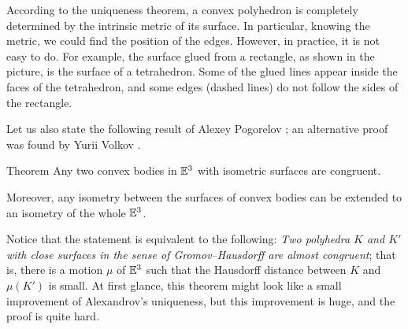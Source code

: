 According to the uniqueness theorem, a convex polyhedron is completely determined by the intrinsic metric of its surface.
In particular, knowing the metric, we could find the position of the edges.
However, in practice, it is not easy to do.
For example, the surface glued from a rectangle, as shown in the picture, is the surface of a tetrahedron.
Some of the glued lines appear inside the faces of the tetrahedron, and some edges (dashed lines) do not follow the sides of the rectangle.

Let us also state the following result of Alexey Pogorelov \cite[chapter III]{pogorelov};
an alternative proof was found by Yurii Volkov \cite{volkov1968}.

\begin{thm}{Theorem}
Any two convex bodies in $\mathbb{E}^3$ with isometric surfaces are congruent.

Moreover, any isometry between the surfaces of convex bodies can be extended to an isometry of the whole $\mathbb{E}^3$.
\end{thm}

Notice that the statement is equivalent to the following:
\textit{Two polyhedra $K$ and $K'$ with close surfaces in the sense of Gromov--Hausdorff are almost congruent};
that is, there is a motion $\mu$ of $\mathbb{E}^3$ such that the Hausdorff distance between $K$ and $\mu(K')$ is small.
At first glance, this theorem might look like a small improvement of Alexandrov's uniqueness,
but this improvement is huge, and the proof is quite hard.
